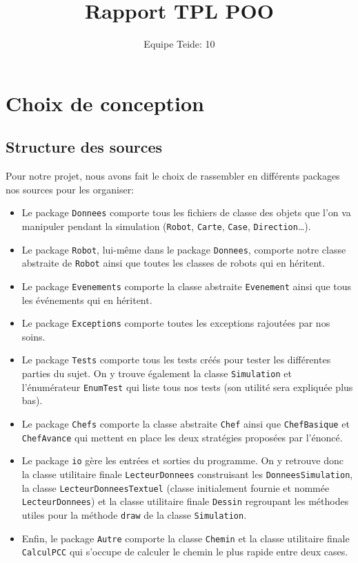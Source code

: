\documentclass[a4paper,10pt]{article} %
\title{Rapport TPL POO}
\author{Equipe Teide: 10}
\date{} %
\begin{document}
\maketitle
\section{Choix de conception}
\subsection{Structure des sources} %
Pour notre projet, nous avons fait le choix de rassembler en différents packages nos sources pour les organiser: 
\begin{itemize}
    \item Le package \texttt{Donnees} comporte tous les fichiers de classe des objets que l'on va manipuler pendant
    la simulation (\texttt{Robot}, \texttt{Carte}, \texttt{Case}, \texttt{Direction}\ldots).
    \item Le package \texttt{Robot}, lui-même dans le package \texttt{Donnees}, comporte notre classe abstraite de \texttt{Robot} ainsi
    que toutes les classes de robots qui en héritent.
    \item Le package \texttt{Evenements} comporte la classe abstraite \texttt{Evenement} ainsi que tous les événements qui en héritent.
    \item Le package \texttt{Exceptions} comporte toutes les exceptions rajoutées par nos soins.
    \item Le package \texttt{Tests} comporte tous les tests créés pour tester les différentes parties du sujet. On y trouve également
    la classe \texttt{Simulation} et l'énumérateur \texttt{EnumTest} qui liste tous nos tests (son utilité sera expliquée plus bas).
    \item Le package \texttt{Chefs} comporte la classe abstraite \texttt{Chef} ainsi que \texttt{ChefBasique} et \texttt{ChefAvance} qui mettent
    en place les deux stratégies proposées par l'énoncé.
    \item Le package \texttt{io} gère les entrées et sorties du programme. 
    On y retrouve donc la classe utilitaire finale \texttt{LecteurDonnees} construisant les \texttt{DonneesSimulation}, la classe 
    \texttt{LecteurDonneesTextuel} (classe initialement fournie et nommée \texttt{LecteurDonnees}) et la classe utilitaire finale 
    \texttt{Dessin} regroupant les méthodes utiles pour la méthode \texttt{draw} de la classe \texttt{Simulation}. 
    \item Enfin, le package \texttt{Autre} comporte la classe \texttt{Chemin} et la classe utilitaire finale \texttt{CalculPCC} 
    qui s'occupe de calculer le chemin le plus rapide entre deux cases.
    
\end{itemize}
\end{document}
